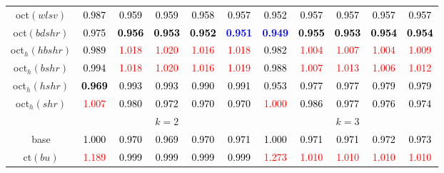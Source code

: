 \begin{tabular}[t]{c|>{}cccc>{}c|ccccc}
oct$(wlsv)$ & \textcolor{black}{0.987} & \textcolor{black}{0.959} & \textcolor{black}{0.959} & \textcolor{black}{0.958} & \textcolor{black}{0.957} & \textcolor{black}{0.952} & \textcolor{black}{0.957} & \textcolor{black}{0.957} & \textcolor{black}{0.957} & \textcolor{black}{0.957}\\
oct$(bdshr)$ & \textcolor{black}{0.975} & \textcolor{black}{\textbf{0.956}} & \textcolor{black}{\textbf{0.953}} & \textcolor{black}{\textbf{0.952}} & \textcolor{blue}{\textbf{0.951}} & \textcolor{blue}{\textbf{0.949}} & \textcolor{black}{\textbf{0.955}} & \textcolor{black}{\textbf{0.953}} & \textcolor{black}{\textbf{0.954}} & \textcolor{black}{\textbf{0.954}}\\
oct$_h(hbshr)$ & \textcolor{black}{0.989} & \textcolor{red}{1.018} & \textcolor{red}{1.020} & \textcolor{red}{1.016} & \textcolor{red}{1.018} & \textcolor{black}{0.982} & \textcolor{red}{1.004} & \textcolor{red}{1.007} & \textcolor{red}{1.004} & \textcolor{red}{1.009}\\
oct$_h(bshr)$ & \textcolor{black}{0.994} & \textcolor{red}{1.018} & \textcolor{red}{1.020} & \textcolor{red}{1.016} & \textcolor{red}{1.019} & \textcolor{black}{0.988} & \textcolor{red}{1.007} & \textcolor{red}{1.013} & \textcolor{red}{1.006} & \textcolor{red}{1.012}\\
oct$_h(hshr)$ & \textcolor{black}{\textbf{0.969}} & \textcolor{black}{0.993} & \textcolor{black}{0.993} & \textcolor{black}{0.990} & \textcolor{black}{0.991} & \textcolor{black}{0.953} & \textcolor{black}{0.977} & \textcolor{black}{0.977} & \textcolor{black}{0.979} & \textcolor{black}{0.979}\\
oct$_h(shr)$ & \textcolor{red}{1.007} & \textcolor{black}{0.980} & \textcolor{black}{0.972} & \textcolor{black}{0.970} & \textcolor{black}{0.970} & \textcolor{red}{1.000} & \textcolor{black}{0.986} & \textcolor{black}{0.977} & \textcolor{black}{0.976} & \textcolor{black}{0.974}\\
\addlinespace[0.3em]
\multicolumn{1}{c}{} & \multicolumn{5}{c}{\textbf{$k = 2$}} & \multicolumn{5}{c}{\textbf{$k = 3$}}\\
base & \textcolor{black}{1.000} & \textcolor{black}{0.970} & \textcolor{black}{0.969} & \textcolor{black}{0.970} & \textcolor{black}{0.971} & \textcolor{black}{1.000} & \textcolor{black}{0.971} & \textcolor{black}{0.971} & \textcolor{black}{0.972} & \textcolor{black}{0.973}\\
ct$(bu)$ & \textcolor{red}{1.189} & \textcolor{black}{0.999} & \textcolor{black}{0.999} & \textcolor{black}{0.999} & \textcolor{black}{0.999} & \textcolor{red}{1.273} & \textcolor{red}{1.010} & \textcolor{red}{1.010} & \textcolor{red}{1.010} & \textcolor{red}{1.010}\\

\end{tabular}
